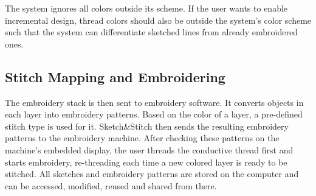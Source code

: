 

The system ignores all colors outside its scheme. If the user wants to enable incremental design, thread colors should also be outside the system's color scheme 
such that the system can differentiate sketched lines from already embroidered ones. 

\subsection{Stitch Mapping and Embroidering}
The embroidery stack is then sent to embroidery software. It converts objects in each layer into embroidery patterns. Based on the color of a layer, a pre-defined stitch type is used for it. Sketch\&Stitch then sends the resulting embroidery patterns to the embroidery machine. After checking these patterns on the machine's embedded display, the user threads the conductive thread first and starts embroidery, re-threading each time a new colored layer is ready to be stitched. All sketches and embroidery patterns are stored on the computer and can be accessed, modified, reused and shared from there.







